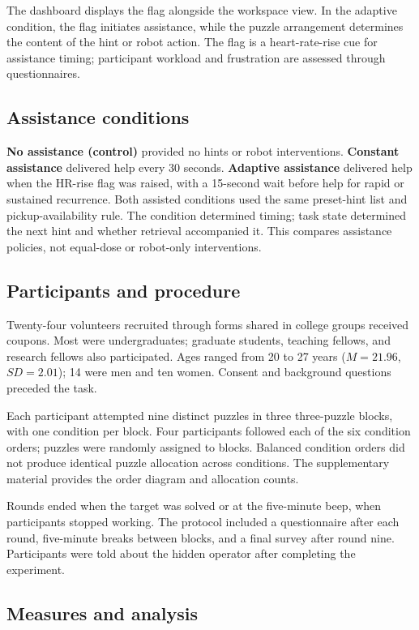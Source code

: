 \documentclass[sigconf,anonymous]{aamas}
\begin{document}
The dashboard displays the flag alongside the workspace view. In the adaptive condition, the flag initiates assistance, while the puzzle arrangement determines the content of the hint or robot action. The flag is a heart-rate-rise cue for assistance timing; participant workload and frustration are assessed through questionnaires.

\subsection{Assistance conditions}

\textbf{No assistance (control)} provided no hints or robot interventions. \textbf{Constant assistance} delivered help every 30 seconds. \textbf{Adaptive assistance} delivered help when the HR-rise flag was raised, with a 15-second wait before help for rapid or sustained recurrence. Both assisted conditions used the same preset-hint list and pickup-availability rule. The condition determined timing; task state determined the next hint and whether retrieval accompanied it. This compares assistance policies, not equal-dose or robot-only interventions.

\subsection{Participants and procedure}

Twenty-four volunteers recruited through forms shared in college groups received coupons. Most were undergraduates; graduate students, teaching fellows, and research fellows also participated. Ages ranged from 20 to 27 years ($M=21.96$, $SD=2.01$); 14 were men and ten women. Consent and background questions preceded the task.

Each participant attempted nine distinct puzzles in three three-puzzle blocks, with one condition per block. Four participants followed each of the six condition orders; puzzles were randomly assigned to blocks. Balanced condition orders did not produce identical puzzle allocation across conditions. The supplementary material provides the order diagram and allocation counts.

Rounds ended when the target was solved or at the five-minute beep, when participants stopped working. The protocol included a questionnaire after each round, five-minute breaks between blocks, and a final survey after round nine. Participants were told about the hidden operator after completing the experiment.

\subsection{Measures and analysis}
\end{document}
